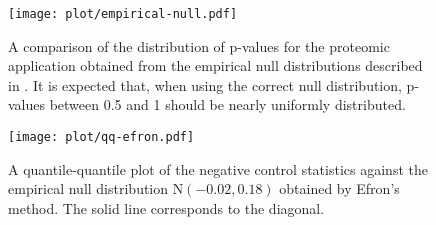 \begin{figure}[h]
  \centering
  \texttt{[image: plot/empirical-null.pdf]}
  \caption{A comparison of the distribution of p-values for the
    proteomic application obtained from the empirical null
    distributions described in . It is
    expected that, when using the correct null distribution, p-values
    between 0.5 and 1 should be nearly uniformly distributed.}
  \label{fig:empirical-null}
\end{figure}

\begin{figure}[h]
  \centering
  \texttt{[image: plot/qq-efron.pdf]}
  \caption{A quantile-quantile plot of the negative control statistics
    against the empirical null distribution $\text{N}(-0.02, 0.18)$
    obtained by Efron's method. The solid line corresponds to the diagonal.}
  \label{fig:qq-efron}
\end{figure}